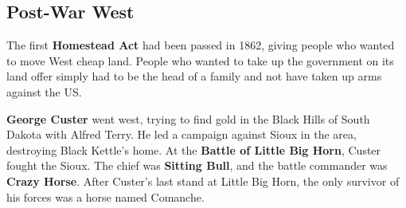 \subsection*{Post-War West}

The first \textbf{Homestead Act} had been passed in 1862, giving people who wanted to move West cheap land.
People who wanted to take up the government on its land offer simply had to be the head of a family
and not have taken up arms against the US\@.

\textbf{George Custer} went west, trying to find gold in the Black Hills of South Dakota with Alfred Terry.
He led a campaign against Sioux in the area, destroying Black Kettle's home.
At the \textbf{Battle of Little Big Horn}, Custer fought the Sioux.
The chief was \textbf{Sitting Bull}, and the battle commander was \textbf{Crazy Horse}.
After Custer's last stand at Little Big Horn, the only survivor of his forces was a horse named Comanche.
